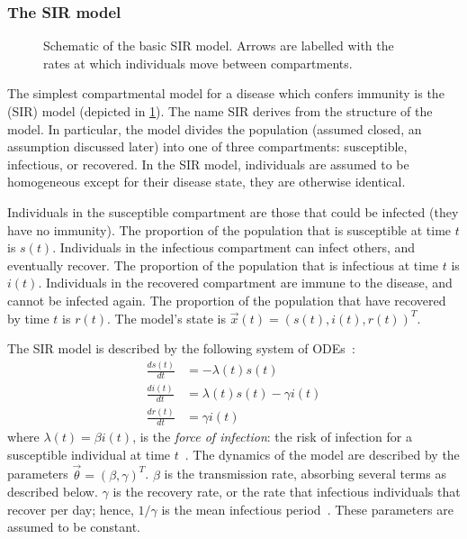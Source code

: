 \documentclass[thesis.tex]{subfiles}
\begin{document}
\subsubsection{The SIR model} \label{SEIR:sec:SIR}

\begin{figure}[h]
  \caption[The SIR model]{Schematic of the basic SIR model. Arrows are labelled with the rates at which individuals move between compartments.}
  \label{SEIR:fig:SIR}
\end{figure}

The simplest compartmental model for a disease which confers immunity is the (SIR) model (depicted in \cref{SEIR:fig:SIR}).
The name SIR derives from the structure of the model.
In particular, the model divides the population (assumed closed, an assumption discussed later) into one of three compartments: susceptible, infectious, or recovered.
In the SIR model, individuals are assumed to be homogeneous except for their disease state, \ie they are otherwise identical.

Individuals in the susceptible compartment are those that could be infected (they have no immunity).
The proportion of the population that is susceptible at time $t$ is $s(t)$.
Individuals in the infectious compartment can infect others, and eventually recover.
The proportion of the population that is infectious at time $t$ is $i(t)$.
Individuals in the recovered compartment are immune to the disease, and cannot be infected again.
The proportion of the population that have recovered by time $t$ is $r(t)$.
The model's state is $\vec{x}(t) = (s(t), i(t), r(t))^T$.

The SIR model is described by the following system of ODEs~\autocite[19]{keelingModeling}:
\begin{align}
\frac{ds(t)}{dt} &= -\lambda(t) s(t) \\
\frac{di(t)}{dt} &= \lambda(t) s(t) - \gamma i(t) \\
\frac{dr(t)}{dt} &= \gamma i(t)
\end{align}
where $\lambda(t) = \beta i(t)$, is the \emph{force of infection}: the risk of infection for a susceptible individual at time $t$~\autocite[17]{keelingModeling}.
The dynamics of the model are described by the parameters $\vec{\theta} = (\beta, \gamma)^T$.
$\beta$ is the transmission rate, absorbing several terms as described below.
$\gamma$ is the recovery rate, or the rate that infectious individuals that recover per day; hence, $1/\gamma$ is the mean infectious period~\autocite[367]{keelingModeling}.
These parameters are assumed to be constant.
\end{document}
